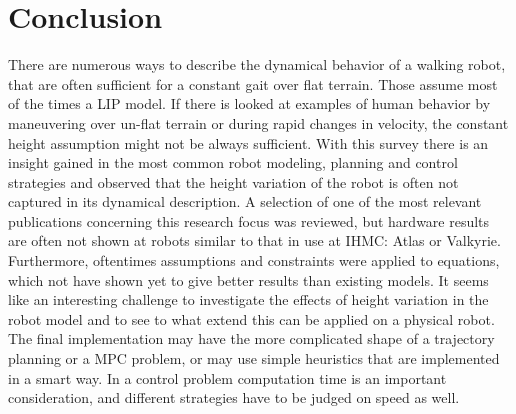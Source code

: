 %
\chapter{Conclusion}%
\label{chap:conclusion}
There are numerous ways to describe the dynamical behavior of a walking robot, that are often sufficient for a constant gait over flat terrain. Those assume most of the times a \ac{LIP} model. If there is looked at examples of human behavior by maneuvering over un-flat terrain or during rapid changes in velocity, the constant height assumption might not be always sufficient. With this survey there is an insight gained in the most common robot modeling, planning and control strategies and observed that the height variation of the robot is often not captured in its dynamical description. A selection of one of the most relevant publications concerning this research focus was reviewed, but hardware results are often not shown at robots similar to that in use at IHMC: Atlas or Valkyrie. Furthermore, oftentimes assumptions and constraints were applied to equations, which not have shown yet to give better results than existing models. It seems like an interesting challenge to investigate the effects of height variation in the robot model and to see to what extend this can be applied on a physical robot. The final implementation may have the more complicated shape of a trajectory planning or a \ac{MPC} problem, or may use simple heuristics that are implemented in a smart way. In a control problem computation time is an important consideration, and different strategies have to be judged on speed as well.